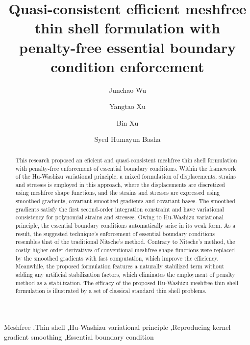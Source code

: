 
\begin{frontmatter}
    \title{Quasi-consistent efficient meshfree thin shell formulation with penalty-free essential boundary condition enforcement}
    \author[1]{Junchao Wu}
    \author[1]{Yangtao Xu}
    \author[1]{Bin Xu}
    \author[1]{Syed Humayun Basha}



\begin{abstract}
This research proposed an eficient and quasi-consistent meshfree thin shell formulation with penalty-free enforcement of essential boundary conditions. Within the framework of the Hu-Washizu variational principle, a mixed formulation of displacements, strains and stresses is employed in this approach, where the displacements are discretized using meshfree shape functions, and the strains and stresses are expressed using smoothed gradients, covariant smoothed gradients and covariant bases. The smoothed gradients satisfy the first second-order integration constraint and have variational consistency for polynomial strains and stresses. Owing to Hu-Washizu variational principle, the essential boundary conditions automatically arise in its weak form. As a result, the suggested technique's enforcement of essential boundary conditions resembles that of the traditional Nitsche's method. Contrary to Nitsche's method, the costly higher order derivatives of conventional meshfree shape functions were replaced by the smoothed gradients with fast computation, which improve the efficiency. Meanwhile, the proposed formulation features a naturally stabilized term without adding any artificial stabilization factors, which eliminates the employment of penalty method as a stabilization. The efficacy of the proposed Hu-Washizu meshfree thin shell formulation is illustrated by a set of classical standard thin shell problems.
\end{abstract}
\begin{keyword}
Meshfree \sep Thin shell \sep Hu-Washizu variational principle \sep Reproducing kernel gradient smoothing \sep Essential boundary condition
\end{keyword}
\end{frontmatter}
